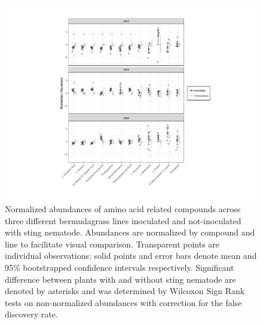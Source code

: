 \documentclass[9pt,lineno]{elife}
\begin{document}
\begin{figure}
\includegraphics[width = 0.95\linewidth]{figures/publication_figures/figure-4.pdf}
\caption{Normalized abundances of amino acid related compounds across three different bermudagrass lines inoculated and not-inoculated with sting nematode.  Abundances are normalized by compound and line to facilitate visual comparison.  Transparent points are individual observations; solid points and error bars denote mean and 95\% bootstrapped confidence intervals respectively.  Significant difference between plants with and without sting nematode are denoted by asterisks and was determined by Wilcoxon Sign Rank tests on non-normalized abundances with correction for the false discovery rate.  }
\label{fig:figure4}
\end{figure}
\end{document}
